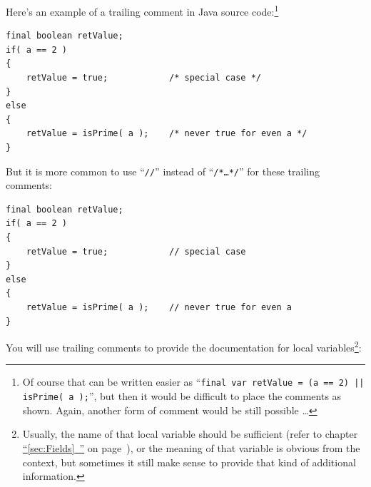 \documentclass[11pt,a4paper, titlepage, parskip=half, headsepline, footsepline, cleardoublepage=current, headheight=1cm]{scrbook}
\newcommand*{\tqfullvref}[1]{\hyperref[{#1}]{“\ref*{#1}~\nameref*{#1}”} on page~\pageref{#1}}
\begin{document}
Here's an example of a trailing comment in Java source code:\footnote{Of course that can be written easier as “\lstinline!final var retValue = (a == 2) || isPrime( a );!”, but then it would be difficult to place the comments as shown. Again, another form of comment would be still possible …}
\begin{lstlisting}
final boolean retValue;
if( a == 2 )
{
    retValue = true;            /* special case */
}
else
{
    retValue = isPrime( a );    /* never true for even a */
}
\end{lstlisting}

But it is more common to use “\verb#//#” instead of “\verb#/*…*/#” for these trailing comments:
\begin{lstlisting}
final boolean retValue;
if( a == 2 )
{
    retValue = true;            // special case
}
else
{
    retValue = isPrime( a );    // never true for even a
}
\end{lstlisting}

You will use trailing comments to provide the documentation for local variables\footnote{Usually, the name of that local variable should be sufficient (refer to chapter \tqfullvref{sec:Fields}), or the meaning of that variable is obvious from the context, but sometimes it still make sense to provide that kind of additional information.}:
\end{document}
